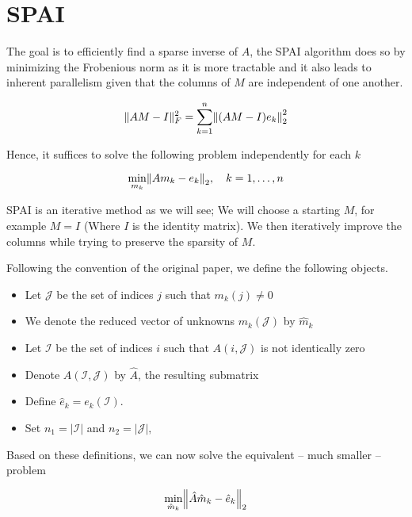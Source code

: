 \documentclass[paper=A4, fontsize=11pt]{scrartcl}
\let\originalleft\left
\let\originalright\right
\renewcommand{\left}{\mathopen{}\mathclose\bgroup\originalleft}
\renewcommand{\right}{\aftergroup\egroup\originalright}
\theoremstyle{remark}
\begin{document}
\section{SPAI}

The goal is to efficiently find a sparse inverse of $A$, the SPAI algorithm \cite{grote} does so by minimizing the Frobenious norm as it is more tractable and it also leads to inherent parallelism given that the columns of $M$ are independent of one another.

\begin{equation}
\|A M-I\|_{F}^{2}=\sum_{k=1}^{n}\left\|(A M-I) e_{k}\right\|_{2}^{2}
\end{equation}

Hence, it suffices to solve the following problem independently for each $k$


\begin{equation}
\min _{m_{k}}\left\|A m_{k}-e_{k}\right\|_{2}, \quad k=1, \ldots, n
\end{equation}

SPAI is an iterative method as we will see; We will choose a starting $M$, for example $M = I$ (Where $I$ is the identity matrix). We then iteratively improve the columns while trying to preserve the sparsity of $M$. 

Following the convention of the original paper, we define the following objects. 

\begin{itemize}
	\item Let \(\mathcal{J}\) be the set of indices \(j\) such that \(m_{k}(j) \neq 0\) 
	\item We denote the reduced vector of unknowns \(m_{k}(\mathcal{J})\) by \(\hat{m}_{k}\)
	\item Let \(\mathcal{I}\) be the set of
	indices \(i\) such that \(A(i, \mathcal{J})\) is not identically zero
	\item Denote \(A(\mathcal{I}, \mathcal{J})\) by \(\hat{A}\), the resulting submatrix
	\item Define \(\hat{e}_{k}=e_{k}(\mathcal{I}) .\)
	\item Set \(n_{1}=|\mathcal{I}|\) and \(n_{2}=|\mathcal{J}|,\)
	
\end{itemize}

Based on these definitions, we can now solve the equivalent -- much smaller -- problem 

\begin{equation}
\min _{\hat{m}_{k}}\left\|\hat{A} \hat{m}_{k}-\hat{e}_{k}\right\|_{2}
\end{equation}
\end{document}
